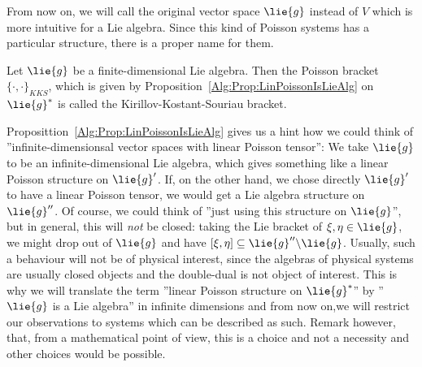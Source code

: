 From now on, we will call the original vector space $\lie{g}$ instead of $V$
which is more intuitive for a Lie algebra. Since this kind of Poisson systems
has a particular structure, there is a proper name for them.
\begin{definition}
	\label{Def:KKS}
	Let $\lie{g}$ be a finite-dimensional Lie algebra. Then the Poisson 
	bracket $\{ \cdot , \cdot \}_{KKS}$, which is given by 
	Proposition~\ref{Alg:Prop:LinPoissonIsLieAlg} on $\lie{g}^*$ is called the 
	Kirillov-Kostant-Souriau bracket.
\end{definition}



Proposittion~\ref{Alg:Prop:LinPoissonIsLieAlg} gives us a hint how we could
think of ''infinite-dimensionsal vector spaces with linear Poisson tensor'':
We take $\lie{g}$ to be an infinite-dimensional Lie algebra, which gives
something like a linear Poisson structure on $\lie{g}'$.
If, on the other hand, we chose directly $\lie{g}'$ to have a linear
Poisson tensor, we would get a Lie algebra structure on $\lie{g}''$.
Of course, we could think of ''just using this structure on $\lie{g}$'',
but in general, this will \emph{not} be closed: taking the Lie bracket of
$\xi, \eta \in \lie{g}$, we might drop out of $\lie{g}$ and have
$[\xi, \eta] \subseteq \lie{g}'' \backslash \lie{g}$. Usually, such
a behaviour will not be of physical interest, since the algebras of 
physical systems are usually closed objects and the double-dual is
not object of interest. This is why we will translate  the term
''linear Poisson structure on $\lie{g}^*$'' by  ''$\lie{g}$ is a Lie 
algebra'' in infinite dimensions and  from now on,we will restrict our 
observations to systems which can be described as such. Remark however, 
that, from a mathematical point of view, this is a choice and not a necessity 
and other choices would be possible.



